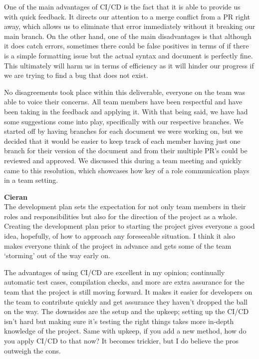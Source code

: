 \documentclass{article}
\begin{document}
One of the main advantages of CI/CD is the fact that it is able to provide us with quick feedback. It directs our attention to a merge conflict from a PR right away, which allows us to eliminate that error immediately without it breaking our main branch. On the other hand, one of the main disadvantages is that although it does catch errors, sometimes there could be false positives in terms of if there is a simple formatting issue but the actual syntax and document is perfectly fine. This ultimately will harm us in terms of efficiency as it will hinder our progress if we are trying to find a bug that does not exist.


No disagreements took place within this deliverable, everyone on the team was able to voice their concerns. All team members have been respectful and have been taking in the feedback and applying it. With that being said, we have had some suggestions come into play, specifically with our respective branches. We started off by having branches for each document we were working on, but we decided that it would be easier to keep track of each member having just one branch for their version of the document and from their multiple PR’s could be reviewed and approved. We discussed this during a team meeting and quickly came to this resolution, which showcases how key of a role communication plays in a team setting.

\textbf{Cieran}\\
The development plan sets the expectation for not only team members in their roles and responsibilities but also for the direction of the project as a whole. Creating the development plan prior to starting the project gives everyone a good idea, hopefully, of how to approach any foreseeable situation. I think it also makes everyone think of the project in advance and gets some of the team ‘storming’ out of the way early on.

The advantages of using CI/CD are excellent in my opinion; continually automatic test cases, compilation checks, and more are extra assurance for the team that the project is still moving forward. It makes it easier for developers on the team to contribute quickly and get assurance they haven’t dropped the ball on the way. The downsides are the setup and the upkeep; setting up the CI/CD isn’t hard but making sure it’s testing the right things takes more in-depth knowledge of the project. Same with upkeep, if you add a new method, how do you apply CI/CD to that now? It becomes trickier, but I do believe the pros outweigh the cons.
\end{document}
